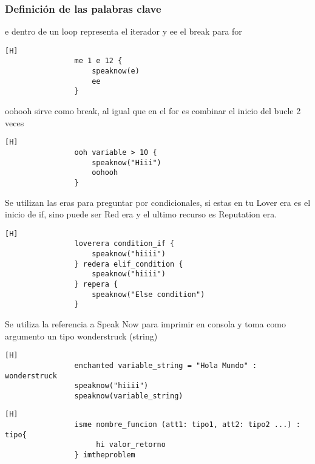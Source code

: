 \documentclass{article}
\begin{document}
                \subsubsection{Definición de las palabras clave}
                e dentro de un loop representa el iterador y ee el break para for
                \begin{lstlisting}[caption={For loop}][H]
                me 1 e 12 {
                    speaknow(e) 
                    ee
                } 
                \end{lstlisting}

                oohooh sirve como break, al igual que en el for es combinar el inicio del bucle 2 veces
                \begin{lstlisting}[caption={While loop}][H]
                ooh variable > 10 {
                    speaknow("Hiii")
                    oohooh
                }                 
                \end{lstlisting}

                Se utilizan las eras para preguntar por condicionales, si estas en tu Lover era es el inicio de if, sino puede ser Red era y el ultimo recurso es Reputation era.

                \begin{lstlisting}[caption={If-Else-Elif}][H]
                loverera condition_if {
                    speaknow("hiiii")
                } redera elif_condition {
                    speaknow("hiiii")
                } repera {
                    speaknow("Else condition")
                }
                \end{lstlisting}

                Se utiliza la referencia a Speak Now para imprimir en consola y toma como argumento un tipo wonderstruck (string)

                \begin{lstlisting}[caption={Imprimir en consola}][H]
                enchanted variable_string = "Hola Mundo" : wonderstruck
                speaknow("hiiii")
                speaknow(variable_string)
                \end{lstlisting}

                \begin{lstlisting}[caption={Definir funcion}][H]
                isme nombre_funcion (att1: tipo1, att2: tipo2 ...) : tipo{
                     hi valor_retorno
                } imtheproblem
                \end{lstlisting}
                
\end{document}
